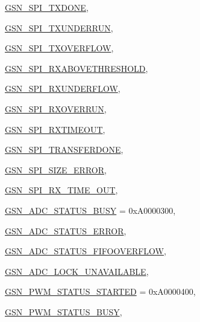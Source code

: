 \begin{DoxyCompactItemize}
\par
\hyperlink{a00659_gga476ae1caf992f8287176b2cc414c8707af46c15379661c98701c00ce5acb4b116}{GSN\_\-SPI\_\-TXDONE}, 
\par
\hyperlink{a00659_gga476ae1caf992f8287176b2cc414c8707a3cfe27cbe2005a1d8ddf6156eaeb4312}{GSN\_\-SPI\_\-TXUNDERRUN}, 
\par
\hyperlink{a00659_gga476ae1caf992f8287176b2cc414c8707a4c586d25e7256e9978e4325cac4e6b18}{GSN\_\-SPI\_\-TXOVERFLOW}, 
\par
\hyperlink{a00659_gga476ae1caf992f8287176b2cc414c8707a2a61e951b8d398c0173fc0343088355f}{GSN\_\-SPI\_\-RXABOVETHRESHOLD}, 
\par
\hyperlink{a00659_gga476ae1caf992f8287176b2cc414c8707a799df9c083791f31fc9f02982bcc15ec}{GSN\_\-SPI\_\-RXUNDERFLOW}, 
\par
\hyperlink{a00659_gga476ae1caf992f8287176b2cc414c8707ad0e88b53b9168c4576474042be20f541}{GSN\_\-SPI\_\-RXOVERRUN}, 
\par
\hyperlink{a00659_gga476ae1caf992f8287176b2cc414c8707a41b807a10317c36700991f8d1fed4c6a}{GSN\_\-SPI\_\-RXTIMEOUT}, 
\par
\hyperlink{a00659_gga476ae1caf992f8287176b2cc414c8707a21486332ecdcecbbbcc57fdb5342dad3}{GSN\_\-SPI\_\-TRANSFERDONE}, 
\par
\hyperlink{a00659_gga476ae1caf992f8287176b2cc414c8707a4da8fc3c4d065325cada3810776a38ef}{GSN\_\-SPI\_\-SIZE\_\-ERROR}, 
\par
\hyperlink{a00659_gga476ae1caf992f8287176b2cc414c8707aedc36b7e3779184cb5d5a15e60739c7b}{GSN\_\-SPI\_\-RX\_\-TIME\_\-OUT}, 
\par
\hyperlink{a00659_gga476ae1caf992f8287176b2cc414c8707aea3bb908643b0bd4618bb808fe4dc8ff}{GSN\_\-ADC\_\-STATUS\_\-BUSY} =  0xA0000300, 
\par
\hyperlink{a00659_gga476ae1caf992f8287176b2cc414c8707afd368d701e428c449255a9462f8aa2d3}{GSN\_\-ADC\_\-STATUS\_\-ERROR}, 
\par
\hyperlink{a00659_gga476ae1caf992f8287176b2cc414c8707a3451755dbd5ce7fc3191b09b80a79ae4}{GSN\_\-ADC\_\-STATUS\_\-FIFOOVERFLOW}, 
\par
\hyperlink{a00659_gga476ae1caf992f8287176b2cc414c8707a4010bdec33fcbc86932406ee6bc688bf}{GSN\_\-ADC\_\-LOCK\_\-UNAVAILABLE}, 
\par
\hyperlink{a00659_gga476ae1caf992f8287176b2cc414c8707ab8779ad9899ef8da7a52e7d695004592}{GSN\_\-PWM\_\-STATUS\_\-STARTED} =  0xA0000400, 
\par
\hyperlink{a00659_gga476ae1caf992f8287176b2cc414c8707ae48f6d7ea6dec76e87a1125db12c1787}{GSN\_\-PWM\_\-STATUS\_\-BUSY}, 

\end{DoxyCompactItemize}
